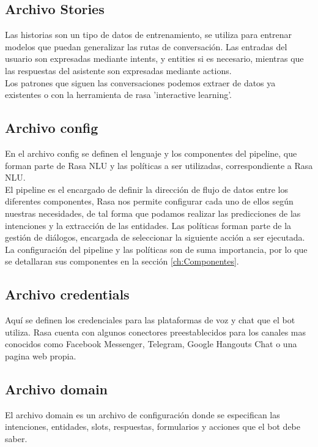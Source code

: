 \subsection{Archivo Stories}
Las historias son un tipo de datos de entrenamiento, se utiliza para entrenar modelos que puedan
generalizar las rutas de conversación. Las entradas del usuario son expresadas mediante intents, y
entities si es necesario,  mientras que las respuestas del asistente son expresadas mediante
actions.\\
Los patrones que siguen las conversaciones podemos extraer de datos ya existentes o con la
herramienta de rasa 'interactive learning'.\cite{Stories_Documentation}

\subsection{Archivo config}
En el archivo config se definen el lenguaje y los componentes del pipeline, que forman parte de
Rasa NLU y las políticas a ser utilizadas, correspondiente a Rasa NLU.\\
El pipeline es el encargado de definir la dirección de flujo de datos entre los diferentes
componentes, Rasa nos permite configurar cada uno de ellos según nuestras necesidades, de tal forma
que podamos realizar las predicciones de las intenciones y la extracción de las entidades. Las
políticas forman parte de la gestión de diálogos, encargada de seleccionar la siguiente acción a
ser ejecutada.\cite{Configuration_Documentation}\\
La configuración del pipeline y las políticas son de suma importancia, por lo que se detallaran sus
componentes en la sección \ref{ch:Componentes}.

\subsection{Archivo credentials}
Aquí se definen los credenciales para las plataformas de voz y chat que el bot utiliza. Rasa cuenta
con algunos conectores preestablecidos para los canales mas conocidos como Facebook Messenger,
Telegram, Google Hangouts Chat o una pagina web propia.\cite{Credentials_Documentation}

\subsection{Archivo domain}
El archivo domain es un archivo de configuración donde se especifican las intenciones, entidades,
slots, respuestas, formularios y acciones que el bot debe saber.\cite{Domain_Documentation}

